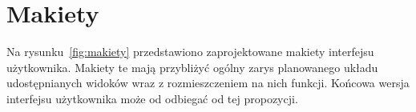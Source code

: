 

\section{Makiety}
Na rysunku~\ref{fig:makiety} przedstawiono zaprojektowane makiety interfejsu użytkownika. Makiety te mają przybliżyć ogólny zarys planowanego układu udostępnianych widoków wraz z rozmieszczeniem na nich funkcji. Końcowa wersja interfejsu użytkownika może od odbiegać od tej propozycji.
